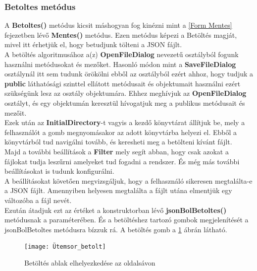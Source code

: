 \documentclass[tocnopagenum]{thesis-ekf}
\theoremstyle{definition}
\theoremstyle{remark}
\begin{document}
	\subsubsection{Betoltes metódus}
	A \textbf{Betoltes()} metódus kicsit máshogyan fog kinézni mint a \ref{Form Mentes} fejezetben lévő \textbf{Mentes()} metódus. Ezen metódus képezi a Betöltés magját, mivel itt érhetjük el, hogy betudjunk tölteni a JSON fájlt.
	\\
	A betöltés algoritmusához a(z) \textbf{OpenFileDialog} nevezetű osztályból fogunk használni metódusokat és mezőket. Hasonló módon mint a \textbf{SaveFileDialog} osztálynál itt sem tudunk örökölni ebből az osztályból ezért ahhoz, hogy tudjuk a \textbf{public} láthatósági szinttel ellátott metódusait és objektumait használni ezért szükségünk lesz az osztály objektumára.
	Ehhez meghívjuk az \textbf{OpenFileDialog} osztályt, és egy objektumán keresztül hívogatjuk meg a publikus metódusait és mezőit.
	\\
	Ezek után az \textbf{InitialDirectory}-t vagyis a kezdő könyvtárat állítjuk be, mely a felhasználót a gomb megnyomásakor az adott könyvtárba helyezi el. Ebből a könyvtárból tud navigálni tovább, és keresheti meg a betölteni kívánt fájlt. 
	\\
	Majd a további beállítások a \textbf{Filter} mely segít abban, hogy csak azokat a fájlokat tudja leszűrni amelyeket tud fogadni a rendszer.
	És még más további beállításokat is tudunk konfigurálni.
	\\
	A beállításokat követően megvizsgáljuk, hogy a felhasználó sikeresen  megtalálta-e a JSON fájlt. Amennyiben helyesen megtalálta a fájlt utána elmentjük egy változóba a fájl nevét.
	\\
	Ezután átadjuk ezt az értéket a konstruktorban lévő \textbf{jsonBolBetoltes()} metódusnak a paraméterében.
	És a betöltéshez tartozó gombok megjelenítését a jsonBolBetoltes metódusra bízzuk rá.
	A betöltés gomb a \ref{fig:betoltesgomb} ábrán látható.
	\begin{figure}[H]	
		\centering
		\texttt{[image: Ütemsor\_betolt]}
		\caption[Betöltés ablak elhelyezkedése az oldalsávon]{Betöltés ablak elhelyezkedése az oldalsávon}
		\label{fig:betoltesgomb}
	\end{figure}
	
	
\end{document}
